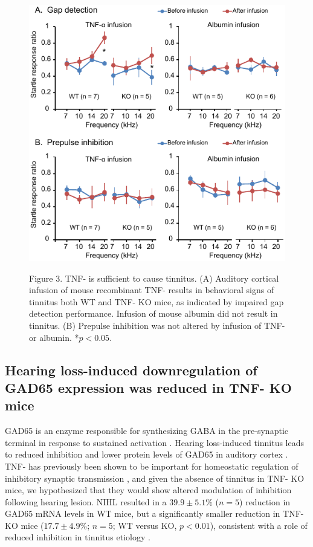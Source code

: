 \begin{figure}[h]
	\centering
		\includegraphics[width=4.5in]{images/C4F3}
	\begin{changemargin}{1in}{1in}
	\footnotesize{Figure 3. TNF-\textalpha{} is sufficient to cause tinnitus. (A) Auditory cortical infusion of mouse recombinant TNF-\textalpha{} results in behavioral signs of tinnitus both WT and TNF-\textalpha{} KO mice, as indicated by impaired gap detection performance. Infusion of mouse albumin did not result in tinnitus. (B) Prepulse inhibition was not altered by infusion of TNF-\textalpha{} or albumin. *$p<0.05$.}
	\end{changemargin}
\end{figure}

\subsection{Hearing loss-induced downregulation of GAD65 expression was reduced in TNF-\textalpha{} KO mice}

GAD65 is an enzyme responsible for synthesizing GABA in the pre-synaptic terminal in response to sustained activation \cite{Tian1999, Iwai2003}. Hearing loss-induced tinnitus leads to reduced inhibition and lower protein levels of GAD65 in auditory cortex \cite{Yang2011a}. TNF-\textalpha{} has previously been shown to be important for homeostatic regulation of inhibitory synaptic transmission \cite{Pribiag2013}, and given the absence of tinnitus in TNF-\textalpha{} KO mice, we hypothesized that they would show altered modulation of inhibition following hearing lesion. NIHL resulted in a $39.9\pm5.1\%$ ($n = 5$) reduction in GAD65 mRNA levels in WT mice, but a significantly smaller reduction in TNF-\textalpha{} KO mice ($17.7\pm4.9\%$; $n=5$; WT versus KO, $p<0.01$), consistent with a role of reduced inhibition in tinnitus etiology \cite{Yang2011a}.


